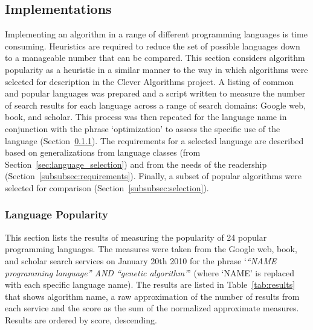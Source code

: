 \documentclass[a4paper, 11pt]{article}
\begin{document}
% 
% 
\subsection{Implementations}
Implementing an algorithm in a range of different programming languages is time consuming. Heuristics are required to reduce the set of possible languages down to a manageable number that can be compared.
This section considers algorithm popularity as a heuristic in a similar manner to the way in which algorithms were selected for description in the Clever Algorithms project. A listing of common and popular languages was prepared and a script written to measure the number of search results for each language across a range of search domains: Google web, book, and scholar. This process was then repeated for the language name in conjunction with the phrase `optimization' to assess the specific use of the language (Section~\ref{subsubsec:popularity}). The requirements for a selected language are described based on generalizations from language classes (from Section~\ref{sec:language_selection}) and from the needs of the readership (Section~\ref{subsubsec:requirements}). Finally, a subset of popular algorithms were selected for comparison (Section~\ref{subsubsec:selection}).

% 
% 
\subsubsection{Language Popularity}
\label{subsubsec:popularity}
This section lists the results of measuring the popularity of 24 popular programming languages. 
The measures were taken from the Google web, book, and scholar search services on January 20th 2010 for the phrase `\emph{``NAME programming language'' AND ``genetic algorithm''}' (where `NAME' is replaced with each specific language name). The results are listed in Table~\ref{tab:results} that shows algorithm name, a raw approximation of the number of results from each service and the score as the sum of the normalized approximate measures. Results are ordered by score, descending.
\end{document}

